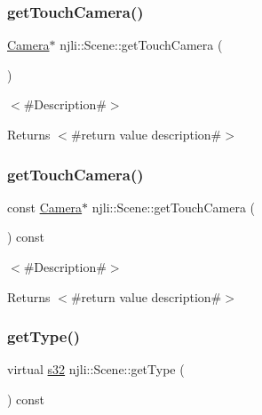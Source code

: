 \subsubsection{\texorpdfstring{get\+Touch\+Camera()}{getTouchCamera()}\hspace{0.1cm}{\footnotesize\ttfamily [1/2]}}
{\footnotesize\ttfamily \mbox{\hyperlink{classnjli_1_1_camera}{Camera}}$\ast$ njli\+::\+Scene\+::get\+Touch\+Camera (\begin{DoxyParamCaption}{ }\end{DoxyParamCaption})}

$<$\#\+Description\#$>$

\begin{DoxyReturn}{Returns}
$<$\#return value description\#$>$ 
\end{DoxyReturn}
\mbox{\label{classnjli_1_1_scene_a82306455f32f71f1865d185ae4588e09}} 
\subsubsection{\texorpdfstring{get\+Touch\+Camera()}{getTouchCamera()}\hspace{0.1cm}{\footnotesize\ttfamily [2/2]}}
{\footnotesize\ttfamily const \mbox{\hyperlink{classnjli_1_1_camera}{Camera}}$\ast$ njli\+::\+Scene\+::get\+Touch\+Camera (\begin{DoxyParamCaption}{ }\end{DoxyParamCaption}) const}

$<$\#\+Description\#$>$

\begin{DoxyReturn}{Returns}
$<$\#return value description\#$>$ 
\end{DoxyReturn}
\mbox{\label{classnjli_1_1_scene_aac1c30b93e02095431fbc7a2739269e3}} 
\subsubsection{\texorpdfstring{get\+Type()}{getType()}}
{\footnotesize\ttfamily virtual \mbox{\hyperlink{_util_8h_aa62c75d314a0d1f37f79c4b73b2292e2}{s32}} njli\+::\+Scene\+::get\+Type (\begin{DoxyParamCaption}{ }\end{DoxyParamCaption}) const\hspace{0.3cm}{\ttfamily [virtual]}}


